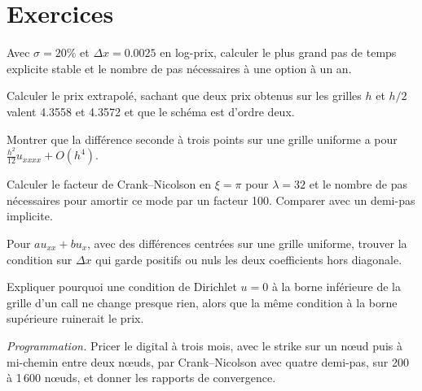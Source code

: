 \section{Exercices}

\begin{exercise}[$\star$]\label{exo:qm:finite-difference-methods:1}
Avec $\sigma = 20\%$ et $\Delta x = 0.0025$ en log-prix, calculer le plus grand pas de temps explicite stable et le nombre de pas nécessaires à une option à un an.
\end{exercise}

\begin{exercise}[$\star$]\label{exo:qm:finite-difference-methods:2}
Calculer le prix extrapolé, sachant que deux prix obtenus sur les grilles $h$ et $h/2$ valent 4.3558 et 4.3572 et que le schéma est d'ordre deux.
\end{exercise}

\begin{exercise}[$\star$]\label{exo:qm:finite-difference-methods:3}
Montrer que la différence seconde à trois points sur une grille uniforme a pour  $\frac{h^2}{12}u_{xxxx} + O(h^4)$.
\end{exercise}

\begin{exercise}[$\star\star$]\label{exo:qm:finite-difference-methods:4}
Calculer le facteur de Crank--Nicolson en $\xi = \pi$ pour $\lambda = 32$ et le nombre de pas nécessaires pour amortir ce mode par un facteur 100. Comparer avec un demi-pas implicite.
\end{exercise}

\begin{exercise}[$\star\star$]\label{exo:qm:finite-difference-methods:5}
Pour $au_{xx} + bu_x$, avec des différences centrées sur une grille uniforme, trouver la condition sur $\Delta x$ qui garde positifs ou nuls les deux coefficients hors diagonale.
\end{exercise}

\begin{exercise}[$\star\star$]\label{exo:qm:finite-difference-methods:6}
Expliquer pourquoi une condition de Dirichlet $u = 0$ à la borne inférieure de la grille d'un call ne change presque rien, alors que la même condition à la borne supérieure ruinerait le prix.
\end{exercise}

\begin{exercise}[$\star\star\star$]\label{exo:qm:finite-difference-methods:7}
\emph{Programmation.} Pricer le digital à trois mois, avec le strike sur un nœud puis à mi-chemin entre deux nœuds, par Crank--Nicolson avec quatre demi-pas, sur 200 à 1\,600 nœuds, et donner les rapports de convergence.
\end{exercise}

